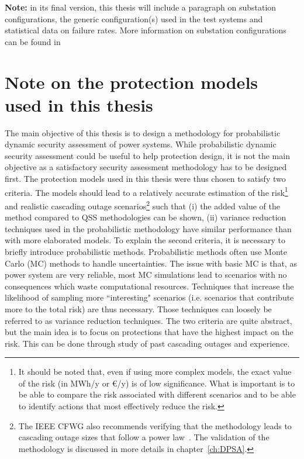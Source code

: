 \textbf{Note:} in its final version, this thesis will include a paragraph on substation configurations, the generic configuration(s) used in the test systems and statistical data on failure rates. More information on substation configurations can be found in~\cite{3rdZoneRevisited}




\section{Note on the protection models used in this thesis}
\label{sec:noteOnProtections}

The main objective of this thesis is to design a methodology for probabilistic dynamic security assessment of power systems. While probabilistic dynamic security assessment could be useful to help protection design, it is not the main objective as a satisfactory security assessment methodology has to be designed first. The protection models used in this thesis were thus chosen to satisfy two criteria. The models should lead to a relatively accurate estimation of the risk\footnote{It should be noted that, even if using more complex models, the exact value of the risk (in MWh/y or €/y) is of low significance. What is important is to be able to compare the risk associated with different scenarios and to be able to identify actions that most effectively reduce the risk.} and realistic cascading outage scenarios\footnote{The IEEE CFWG also recommends verifying that the methodology leads to cascading outage sizes that follow a power law~\cite{Benchmarking2016}. The validation of the methodology is discussed in more details in chapter~\ref{ch:DPSA}.} such that (i) the added value of the method compared to QSS methodologies can be shown, (ii) variance reduction techniques used in the probabilistic methodology have similar performance than with more elaborated models. To explain the second criteria, it is necessary to briefly introduce probabilistic methods. Probabilistic methods often use Monte Carlo (MC) methods to handle uncertainties. The issue with basic MC is that, as power system are very reliable, most MC simulations lead to scenarios with no consequences which waste computational resources. Techniques that increase the likelihood of sampling more ``interesting" scenarios (i.e. scenarios that contribute more to the total risk) are thus necessary. Those techniques can loosely be referred to as variance reduction techniques. The two criteria are quite abstract, but the main idea is to focus on protections that have the highest impact on the risk. This can be done through study of past cascading outages and experience.

